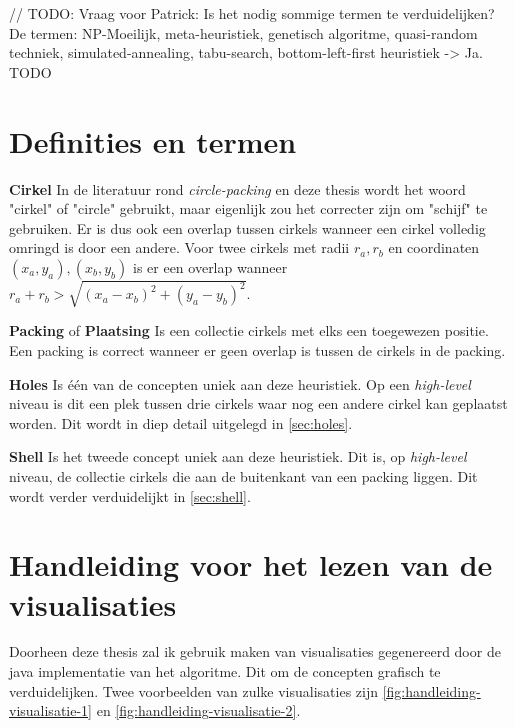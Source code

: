 \documentclass[12pt,a4paper,oneside]{book}
\begin{document}
// TODO: Vraag voor Patrick: Is het nodig sommige termen te verduidelijken? De termen: NP-Moeilijk, meta-heuristiek, genetisch algoritme, quasi-random techniek, simulated-annealing, tabu-search, bottom-left-first heuristiek -> Ja. TODO

\chapter{Definities en termen} \label{chap:definities}

\textbf{Cirkel} In de literatuur rond \textit{circle-packing} en deze thesis wordt het woord "cirkel" of "circle" gebruikt, maar eigenlijk zou het correcter zijn om "schijf" te gebruiken.
Er is dus ook een overlap tussen cirkels wanneer een cirkel volledig omringd is door een andere.
Voor twee cirkels met radii $r_a, r_b$ en coordinaten  $(x_a,y_a), (x_b,y_b)$ is er een overlap wanneer $r_a + r_b > \sqrt{(x_a-x_b)^2 + (y_a-y_b)^2}$. 

\textbf{Packing} of \textbf{Plaatsing} Is een collectie cirkels met elks een toegewezen positie. Een packing is correct wanneer er geen overlap is tussen de cirkels in de packing.

\textbf{Holes} Is één van de concepten uniek aan deze heuristiek. Op een \textit{high-level} niveau is dit een plek tussen drie cirkels waar nog een andere cirkel kan geplaatst worden. Dit wordt in diep detail uitgelegd in \autoref{sec:holes}.

\textbf{Shell} Is het tweede concept uniek aan deze heuristiek. Dit is, op \textit{high-level} niveau, de collectie cirkels die aan de buitenkant van een packing liggen. Dit wordt verder verduidelijkt in \autoref{sec:shell}.

\chapter{Handleiding voor het lezen van de visualisaties} \label{chap:handleiding-visualisaties}

Doorheen deze thesis zal ik gebruik maken van visualisaties gegenereerd door de java implementatie van het algoritme.
Dit om de concepten grafisch te verduidelijken.
Twee voorbeelden van zulke visualisaties zijn \autoref{fig:handleiding-visualisatie-1} en \autoref{fig:handleiding-visualisatie-2}.
\end{document}
